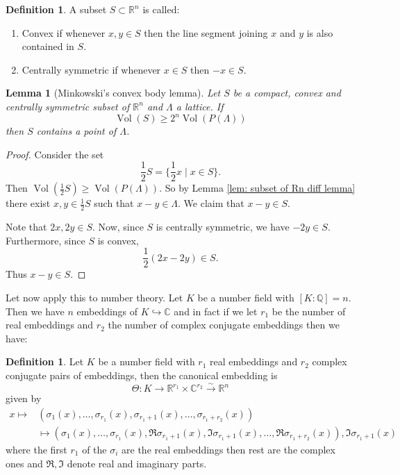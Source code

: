 \documentclass[11pt,a4paper]{report}
\theoremstyle{plain}
\newtheorem{lemma}[subsection]{Lemma}
\theoremstyle{definition}
\newtheorem{definition}[subsection]{Definition}
\theoremstyle{definition}
\newcommand{\RR}{\mathbb{R}}
\def\CC{\mathbb{C}}
\def\QQ{\mathbb{Q}}
\def \s {\sigma}
\def \s {\sigma}
\DeclareMathOperator{\Vol}{Vol}
\def \lra{\longrightarrow}
\begin{document}
	\begin{definition}
		A subset $S \subset \RR^n$ is called:
		\begin{enumerate}
			\item Convex if whenever $x,y \in S$ then the line segment joining $x$ and $y$ is also contained in $S$.
			\item Centrally symmetric if whenever $x \in S$ then $-x \in S$.
		\end{enumerate}
	\end{definition}
	
	\begin{lemma}[Minkowski's convex body lemma]\label{lem: mink conv bod}
		Let $S$ be a compact, convex and centrally symmetric subset of $\RR^n$ and $\Lambda$ a lattice. If \[\Vol(S) \geq 2^n \Vol(P(\Lambda))\] then $S$ contains a point of $\Lambda$. 
	\end{lemma}
	
	\begin{proof}
		Consider the set \[\frac{1}{2}S=\{\frac{1}{2} x \mid x \in S\}.\] Then $\Vol(\frac{1}{2}S) \geq \Vol(P(\Lambda))$. So by Lemma \ref{lem: subset of Rn diff lemma} there exist $x,y \in \frac{1}{2}S$ such that $x-y \in \Lambda$. We claim that $x-y \in S$. 
		
		Note that $2x,2y \in S$. Now, since $S$ is centrally symmetric, we have $-2y \in S$. Furthermore, since $S$ is convex, \[\frac{1}{2} (2x-2y) \in S.\] Thus $x-y \in S$.
	\end{proof}
	
	Let now apply this to number theory. Let $K$ be a number field with $[K:\QQ]=n$. Then we have $n$ embeddings of $K \hookrightarrow \CC$ and in fact if we let $r_1$ be the number of real embeddings and $r_2$ the number of complex conjugate embeddings then we have:
	
	\begin{definition}
		Let $K$ be a number field with $r_1$ real embeddings and $r_2$ complex conjugate pairs of embeddings, then the canonical embedding is \[\Theta: K \lra \RR^{r_1} \times \CC^{r_2} \overset{\sim}{\lra} \RR^n\] given by \begin{align*}
			x \mapsto& (\s_1(x),\dots,\s_{r_1}(x),\s_{r_1+1}(x),\dots,\s_{r_1+r_2}(x))\\ &\mapsto (\s_1(x),\dots,\s_{r_1}(x),\Re \s_{r_1+1}(x),\Im\s_{r_1+1}(x), \dots,\Re \s_{r_1+r_2}(x)), \Im \s_{r_1+1}(x) 
		\end{align*} where the first $r_1$ of the $\s_i$ are the real embeddings then rest are the complex ones and $\Re,\Im$ denote real and imaginary parts.
	\end{definition}
	
\end{document}
